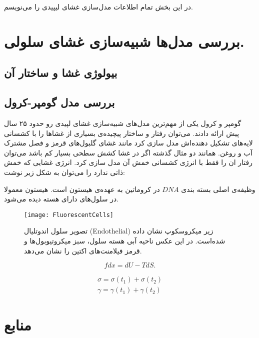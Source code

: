 \setRL
\clearpage
{} 

در این بخش تمام اطلاعات مدل‌سازی غشای لیپیدی را می‌نویسم.
\section{
بررسی مدل‌ها شبیه‌سازی غشای سلولی.
}
\subsection{
بیولوژی غشا و ساختار آن
}
\subsection{
بررسی مدل گومپر-کرول
}
گومپر
و کرول
یکی از مهم‌ترین مدل‌های شبیه‌سازی غشای لپیدی رو حدود ۲۵ سال پیش ارا‌ئه دادند. می‌توان رفتار و ساختار پیچیده‌ی بسیاری از غشاها را با کشسانی لایه‌های تشکیل دهنده‌اش مدل سازی کرد مانند غشای گلبول‌های قرمز و فصل مشترک آب و روغن. همانند دو مثال گذشته اگر در غشا کشش سطحی بسیار کم باشد می‌توان رفتار ان را فقط با انرژی کشسانی خمش آن مدل سازی کرد. انرژی غشایی که خمش ذاتی ندارد را می‌توان به شکل زیر نوشت:
 




وظیفه‌ی اصلی بسته بندی $DNA$ در کروماتین به عهده‌ی هیستون است\cite{Hammond:2017sp}. هیستون معمولا در سلول‌های دارای هسته دیده می‌شود.

\begin{figure}[h]
\begin{center}
\texttt{[image: FluorescentCells]}
\caption{
تصویر سلول اندوتلیال (Endothelial) زیر میکروسکوپ نشان داده شده‌است. در این عکس  ناحیه آبی هسته سلول،‌ سبز میکروتیوبول‌ها و قرمز فیلامنت‌های اکتین را نشان می‌دهد.\cite{wiki-cell}
}
\label{fig:wiki-cyto}
\end{center}
\end{figure}

\begin{equation}
fdx=dU-TdS.\label{eq:second_thermo}
\end{equation}

\begin{equation}
\begin{aligned}
\sigma=\sigma(t_1)+\sigma(t_2) \\
\gamma=\gamma(t_1)+\gamma(t_2)
\end{aligned}
\end{equation}


\clearpage
\section{منابع}

\unsetRL
% 
%


	        
	       